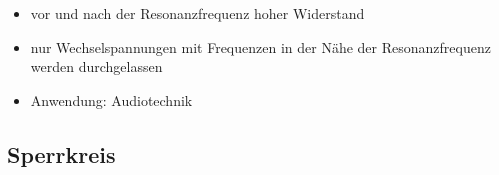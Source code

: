 \begin{frame}
\begin{columns}
\begin{center}
\begin{figure}
      \end{figure}
    \end{center}
  \end{columns}
  \pause
  \begin{itemize}
    \item vor und nach der Resonanzfrequenz hoher Widerstand
    \item nur Wechselspannungen mit Frequenzen in der Nähe der Resonanzfrequenz werden durchgelassen
    \item Anwendung: Audiotechnik
  \end{itemize}
\end{frame}

\subsection*{Sperrkreis}
